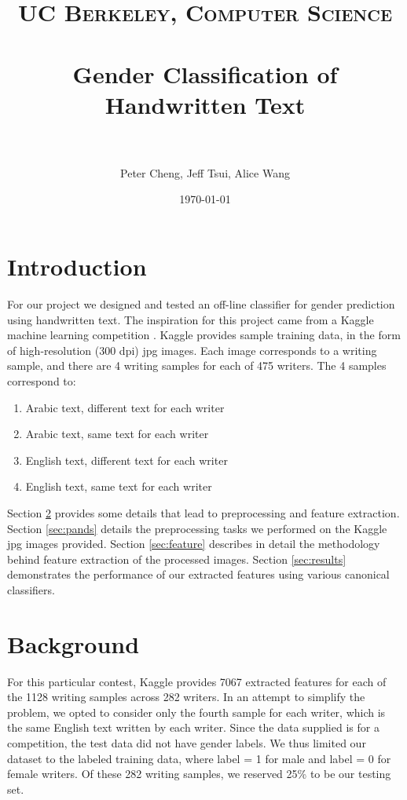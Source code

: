 \documentclass[paper=a4, fontsize=11pt]{scrartcl} %
\title{	
\normalfont \normalsize 
\textsc{UC Berkeley, Computer Science} \\ [25pt] %
\horrule{0.5pt} \\[0.4cm] %
\huge Gender Classification of Handwritten Text \\ %
\horrule{2pt} \\[0.5cm] %
}
\author{Peter Cheng, Jeff Tsui, Alice Wang} %
\date{\normalsize\today} %
\numberwithin{equation}{section} %
\numberwithin{figure}{section} %
\numberwithin{table}{section} %
\begin{document}
\maketitle %

\section{Introduction}
For our project we designed and tested an off-line classifier for
gender prediction using handwritten text. The inspiration for this
project came from a Kaggle machine learning competition
\cite{kaggle}. Kaggle provides sample training data, in the form of
high-resolution (300 dpi) jpg images. Each image corresponds to a
writing sample, and there are 4 writing samples for each of 475
writers. The 4 samples correspond to:

\begin{enumerate}
\item Arabic text, different text for each writer
\item Arabic text, same text for each writer
\item English text, different text for each writer
\item English text, same text for each writer
\end{enumerate}

Section \ref{sec:background} provides some details that lead to
preprocessing and feature extraction. Section \ref{sec:pands} details
the preprocessing tasks we performed on the Kaggle jpg images
provided. Section \ref{sec:feature} describes in detail the
methodology behind feature extraction of the processed images. Section
\ref{sec:results} demonstrates the performance of our extracted
features using various canonical classifiers.

\section{Background}
\label{sec:background}
For this particular contest, Kaggle provides 7067 extracted features
for each of the 1128 writing samples across 282 writers. In an attempt
to simplify the problem, we opted to consider only the fourth sample
for each writer, which is the same English text written by each
writer. Since the data supplied is for a competition, the test data
did not have gender labels. We thus limited our dataset to the labeled
training data, where label = 1 for male and label = 0 for female writers. Of
these 282 writing samples, we reserved 25\% to be our testing set.
\end{document}
